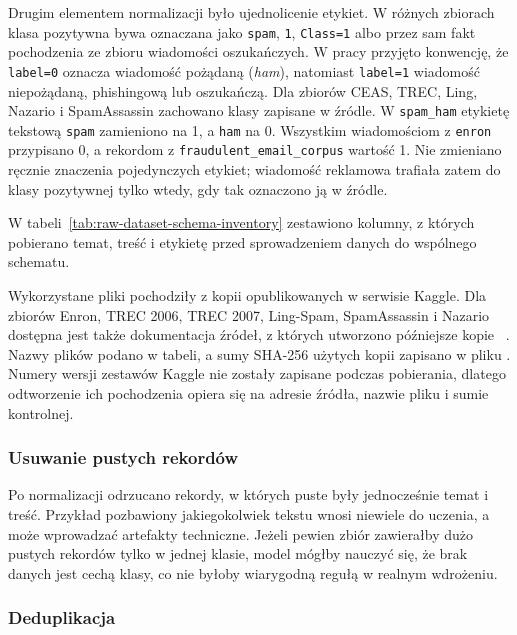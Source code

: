 Drugim elementem normalizacji było ujednolicenie etykiet. W różnych zbiorach
klasa pozytywna bywa oznaczana jako \texttt{spam}, \texttt{1}, \texttt{Class=1}
albo przez sam fakt pochodzenia ze zbioru wiadomości oszukańczych. W pracy
przyjęto konwencję, że \texttt{label=0} oznacza wiadomość pożądaną
(\emph{ham}), natomiast \texttt{label=1} wiadomość niepożądaną, phishingową lub
oszukańczą. Dla zbiorów CEAS, TREC, Ling, Nazario i SpamAssassin
zachowano klasy zapisane w źródle. W \texttt{spam\_ham} etykietę tekstową
\texttt{spam} zamieniono na 1, a \texttt{ham} na 0. Wszystkim wiadomościom z
\texttt{enron} przypisano 0, a rekordom z
\texttt{fraudulent\_email\_corpus} wartość 1. Nie zmieniano ręcznie znaczenia
pojedynczych etykiet; wiadomość reklamowa trafiała zatem do klasy pozytywnej
tylko wtedy, gdy tak oznaczono ją w źródle.

W tabeli~\ref{tab:raw-dataset-schema-inventory} zestawiono kolumny, z których
pobierano temat, treść i etykietę przed sprowadzeniem danych do wspólnego
schematu.



Wykorzystane pliki pochodziły z kopii opublikowanych w serwisie Kaggle. Dla
zbiorów Enron, TREC 2006, TREC 2007, Ling-Spam, SpamAssassin i Nazario dostępna jest także
dokumentacja źródeł, z których utworzono późniejsze kopie
~\autocite{cmu-enron-email-dataset,cormack-trec-2006-spam-track,cormack-trec-2007-spam-track,androutsopoulos-naive-bayes-spam,spamassassin-public-corpus,nazario-phishing-corpus}.
Nazwy plików podano w tabeli, a sumy SHA-256 użytych kopii zapisano w pliku
. Numery wersji zestawów Kaggle nie
zostały zapisane podczas pobierania, dlatego odtworzenie ich pochodzenia opiera
się na adresie źródła, nazwie pliku i sumie kontrolnej.

\subsubsection{Usuwanie pustych rekordów}

Po normalizacji odrzucano rekordy, w których puste były jednocześnie temat i treść.
Przykład pozbawiony jakiegokolwiek tekstu wnosi niewiele do uczenia, a może wprowadzać artefakty techniczne.
Jeżeli pewien zbiór zawierałby dużo pustych rekordów tylko w jednej klasie, model mógłby nauczyć się, że brak
danych jest cechą klasy, co nie byłoby wiarygodną regułą w realnym wdrożeniu.

\subsubsection{Deduplikacja}

